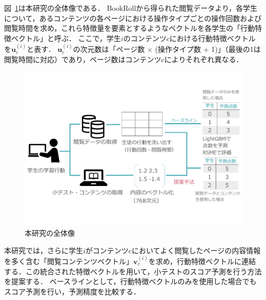 \documentclass[platex,dvipdfmx,a4paper,twocolumn,base=10pt,jbase=10pt,ja=standard]{bxjsarticle}
\begin{document}
図~\ref{fig:overview}は本研究の全体像である．
BookRollから得られた閲覧データより，各学生について，あるコンテンツの各ページにおける操作タイプごとの操作回数および閲覧時間を求め，これら特徴量を要素とするようなベクトルを各学生の「行動特徴ベクトル」と呼ぶ．
ここで，学生$i$のコンテンツ$c$における行動特徴ベクトルを$\bm{u}^{(i)}_c$と表す．
$\bm{u}^{(i)}_c$の次元数は「ページ数 $\times$ (操作タイプ数 + 1)」（最後の1は閲覧時間に対応）であり，ページ数はコンテンツ$c$によりそれぞれ異なる．

\begin{figure}[tbp]
  \centering
  \includegraphics[width=0.9\linewidth]{zentaizo.pdf}
  \vspace{-8mm}
  \caption{本研究の全体像}
  \label{fig:overview}
  \vspace{-8mm}
\end{figure}

本研究では，さらに学生$i$がコンテンツ$c$においてよく閲覧したページの内容情報を多く含む「閲覧コンテンツベクトル」$\bm{v}^{(i)}_c$を求め，行動特徴ベクトルに連結する．この統合された特徴ベクトルを用いて，小テストのスコア予測を行う方法を提案する．
ベースラインとして，行動特徴ベクトルのみを使用した場合でもスコア予測を行い，予測精度を比較する．



\end{document}
